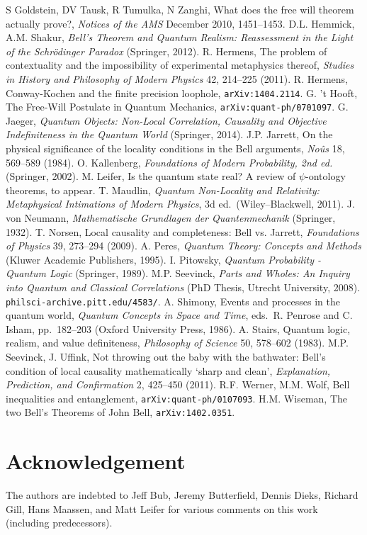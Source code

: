\documentclass[11pt]{article}
\begin{document}
\begin{thebibliography}{99}
  S Goldstein, DV Tausk, R Tumulka, N Zanghi, What does the free will theorem actually prove?, \emph{Notices of the AMS} December 2010, 1451--1453.
 D.L. Hemmick, A.M. Shakur, \emph{Bell's Theorem and Quantum Realism:  Reassessment in the Light of the Schr\"{o}dinger Paradox}
(Springer, 2012). 
 R. Hermens, The problem of contextuality and the impossibility of experimental metaphysics thereof, \emph{Studies in History and Philosophy of Modern Physics} 42, 214--225 (2011).
 R. Hermens, Conway-Kochen and the finite precision loophole,  \texttt{arXiv:1404.2114}.
  G. 't Hooft, The Free-Will Postulate in Quantum Mechanics, \texttt{arXiv:quant-ph/0701097}.
  G. Jaeger, \emph{Quantum Objects: Non-Local Correlation, Causality and Objective Indefiniteness in the Quantum World} (Springer, 2014).
 J.P. Jarrett, On the physical significance of the locality conditions in the Bell arguments,
\emph{No\^{u}s} 18, 569--589 (1984).
 O. Kallenberg, \emph{Foundations of Modern Probability, 2nd ed.} (Springer, 2002).
 M. Leifer, Is the quantum state real? A review of $\psi$-ontology theorems, to appear.
	 T. Maudlin, \emph{Quantum Non-Locality and Relativity: Metaphysical Intimations of Modern Physics}, 3d ed.\ (Wiley--Blackwell, 2011).
	 J. von Neumann, \emph{Mathematische Grundlagen der Quantenmechanik} (Springer, 1932).
 T. Norsen, Local causality and completeness: Bell vs. Jarrett, \emph{ Foundations of Physics} 39, 273--294 (2009). 
 A. Peres, \emph{Quantum Theory: Concepts and Methods} (Kluwer Academic Publishers, 1995).
  I. Pitowsky, {\it Quantum Probability - Quantum Logic} (Springer, 1989).
 M.P. Seevinck, \emph{Parts and Wholes: An Inquiry into Quantum and Classical Correlations} (PhD Thesis, Utrecht University, 2008). \texttt{philsci-archive.pitt.edu/4583/}.
 A. Shimony, Events and processes in the quantum world, \emph{Quantum Concepts in Space and Time}, eds.\ R. Penrose and C. Isham, pp.\ 182--203 (Oxford University Press, 1986).
 A. Stairs, Quantum logic, realism, and value definiteness, \emph{Philosophy of Science} 50, 578--602 (1983).
   M.P. Seevinck, J. Uffink, Not throwing out the baby with the bathwater: Bell's condition of local causality mathematically `sharp and clean', \emph{Explanation, Prediction, and Confirmation}  2, 425--450 (2011).
   R.F. Werner,   M.M. Wolf, Bell inequalities and entanglement, \texttt{arXiv:quant-ph/0107093}.
   H.M. Wiseman, The two Bell's Theorems of John Bell, \texttt{arXiv:1402.0351}.
    \end{thebibliography}
    \section*{Acknowledgement}
The authors are indebted to Jeff Bub, Jeremy Butterfield, Dennis Dieks, Richard Gill, Hans Maassen, and Matt Leifer for various comments on this work (including  predecessors).
\end{document}
